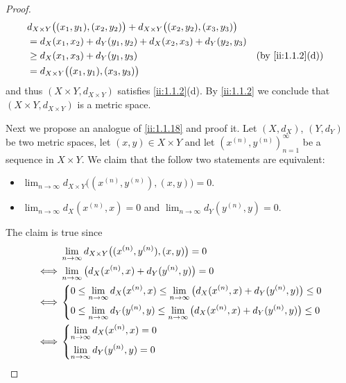 \begin{proof}
\begin{align*}
     & d_{X \times Y}\big((x_1, y_1), (x_2, y_2)\big) + d_{X \times Y}\big((x_2, y_2), (x_3, y_3)\big)                    \\
     & = d_X(x_1, x_2) + d_Y(y_1, y_2) + d_X(x_2, x_3) + d_Y(y_2, y_3)                                                    \\
     & \geq d_X(x_1, x_3) + d_Y(y_1, y_3)                                                              &  & \by{ii:1.1.2}[d] \\
     & = d_{X \times Y}\big((x_1, y_1), (x_3, y_3)\big)
  \end{align*}
  and thus \((X \times Y, d_{X \times Y})\) satisfies \cref{ii:1.1.2}(d).
  By \cref{ii:1.1.2} we conclude that \((X \times Y, d_{X \times Y})\) is a metric space.

  Next we propose an analogue of \cref{ii:1.1.18} and proof it.
  Let \((X, d_X)\), \((Y, d_Y)\) be two metric spaces, let \((x, y) \in X \times Y\) and let \((x^{(n)}, y^{(n)})_{n = 1}^\infty\) be a sequence in \(X \times Y\).
  We claim that the follow two statements are equivalent:
  \begin{itemize}
    \item \(\lim_{n \to \infty} d_{X \times Y}\big((x^{(n)}, y^{(n)}), (x, y)\big) = 0\).
    \item \(\lim_{n \to \infty} d_X(x^{(n)}, x) = 0\) and \(\lim_{n \to \infty} d_Y(y^{(n)}, y) = 0\).
  \end{itemize}
  The claim is true since
  \begin{align*}
         & \lim_{n \to \infty} d_{X \times Y}\big((x^{(n)}, y^{(n)}), (x, y)\big) = 0                                             \\
    \iff & \lim_{n \to \infty} \big(d_X(x^{(n)}, x) + d_Y(y^{(n)}, y)\big) = 0                                                    \\
    \iff & \begin{dcases}
             0 \leq \lim_{n \to \infty} d_X(x^{(n)}, x) \leq \lim_{n \to \infty} \big(d_X(x^{(n)}, x) + d_Y(y^{(n)}, y)\big) \leq 0 \\
             0 \leq \lim_{n \to \infty} d_Y(y^{(n)}, y) \leq \lim_{n \to \infty} \big(d_X(x^{(n)}, x) + d_Y(y^{(n)}, y)\big) \leq 0
           \end{dcases} \\
    \iff & \begin{dcases}
             \lim_{n \to \infty} d_X(x^{(n)}, x) = 0 \\
             \lim_{n \to \infty} d_Y(y^{(n)}, y) = 0
           \end{dcases}
  \end{align*}


\end{proof}
